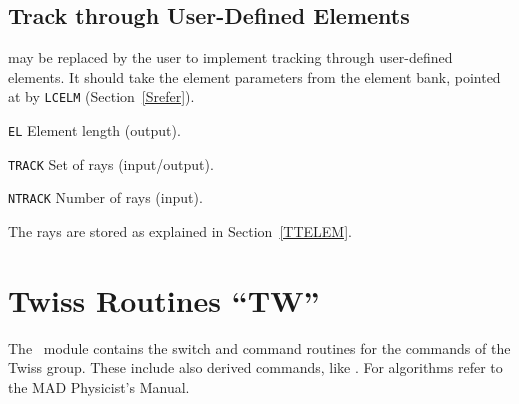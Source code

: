 \section{Track through User-Defined Elements}
\label{TTUSER}
may be replaced by the user to implement tracking through user-defined
elements.
It should take the element parameters from the element bank,
pointed at by {\tt LCELM} (Section~\ref{Srefer}).
\begin{mylist}
\item[\tt EL]
Element length (output).
\item[\tt TRACK]
Set of rays (input/output).
\item[\tt NTRACK]
Number of rays (input).
\end{mylist}
The rays are stored as explained in Section~\ref{TTELEM}.


\chapter{Twiss Routines ``TW''}
\label{TW}
The ~module contains the switch and command routines for
the commands of the Twiss group.
These include also derived commands, like .
For algorithms refer to the MAD Physicist's Manual.

